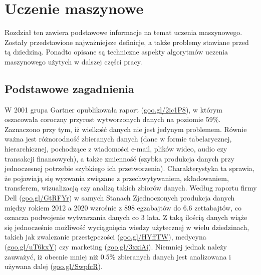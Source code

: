 \documentclass[12pt,a4paper,twoside,openany]{book}
\begin{document}
\clearpage

\chapter{Uczenie maszynowe}

Rozdział ten zawiera podstawowe informacje na temat uczenia maszynowego. Zostały przedstawione najważniejsze definicje, a także problemy stawiane przed tą dziedziną. Ponadto opisane są techniczne aspekty algorytmów uczenia maszynowego użytych w dalszej części pracy.

\section{Podstawowe zagadnienia}

W 2001 grupa Gartner opublikowała raport (\url{goo.gl/2ic1P8}), w którym oszacowała coroczny przyrost wytworzonych danych na poziomie 59\%. Zaznaczono przy tym, iż wielkość danych nie jest jedynym problemem. Równie ważna jest różnorodność zbieranych danych (dane w formie tabelarycznej, hierarchicznej, pochodzące z wiadomości e-mail, plików wideo, audio czy transakcji finansowych), a także zmienność (szybka produkcja danych przy jednoczesnej potrzebie szybkiego ich przetworzenia). Charakterystyka ta sprawia, że pojawiają się wyzwania związane z przechwytywaniem, składowaniem, transferem, wizualizacją czy analizą takich zbiorów danych. Według raportu firmy Dell (\url{goo.gl/GtRFYr}) w samych Stanach Zjednoczonych produkcja danych między rokiem 2012 a 2020 wzrośnie z 898 egzabajtów do 6.6 zettabajtów, co oznacza podwojenie wytwarzania danych co 3 lata. Z taką ilością danych wiąże się jednocześnie możliwość wyciągnięcia wiedzy użytecznej w wielu dziedzinach, takich jak zwalczanie przestępczości (\url{goo.gl/HYffTW}), medycyna (\url{goo.gl/uT6kxY}) czy marketing (\url{goo.gl/3xziAi}). Niemniej jednak należy zauważyć, iż obecnie mniej niż 0.5\% zbieranych danych jest analizowana i używana dalej (\url{goo.gl/SwpfcR}). 
\end{document}

